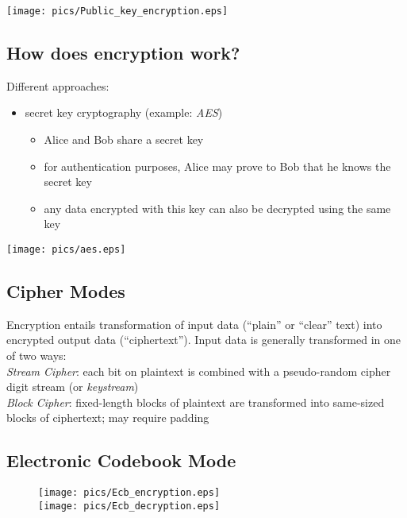 \documentclass[xga]{xdvislides}
\begin{document}
\begin{center}
	\texttt{[image: pics/Public\_key\_encryption.eps]}
 \end{center}

\subsection{How does encryption work?}
Different approaches:
\begin{itemize}
	\item secret key cryptography (example: {\em AES})
		\begin{itemize}
			\item Alice and Bob share a secret key
			\item for authentication purposes, Alice may prove
				to Bob that he knows the secret key
			\item any data encrypted with this key
				can also be decrypted using the same key
		\end{itemize}
\end{itemize}

 \begin{center}
        \texttt{[image: pics/aes.eps]}
 \end{center}

\subsection{Cipher Modes}
Encryption entails transformation of input data (``plain''
or ``clear'' text) into encrypted output data
(``ciphertext'').  Input data is generally transformed
in one of two ways:
\\

{\em Stream Cipher}: each bit on plaintext is combined
with a pseudo-random cipher digit stream (or {\em keystream})
\\

{\em Block Cipher}: fixed-length blocks of plaintext
are transformed into same-sized blocks of ciphertext;
may require padding


\subsection{Electronic Codebook Mode}
\begin{figure}[hb]
    \begin{center}
        \texttt{[image: pics/Ecb\_encryption.eps]} \\
        \texttt{[image: pics/Ecb\_decryption.eps]} \\
    \end{center}
\end{figure}
\end{document}
